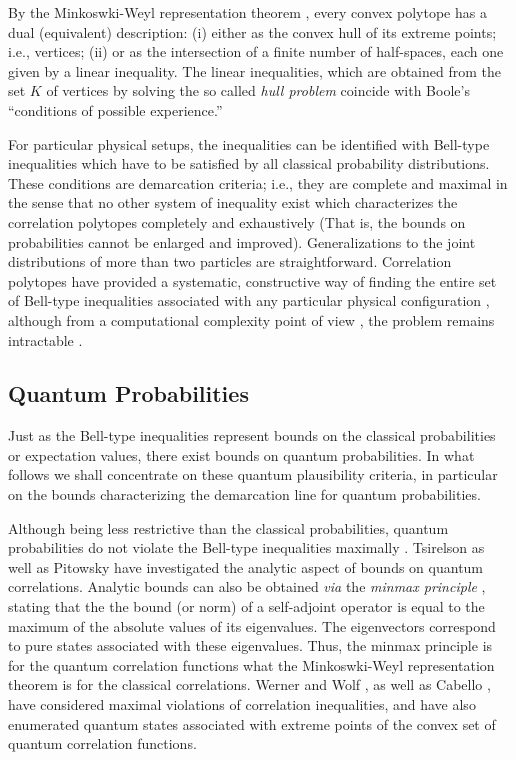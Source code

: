 \documentclass[pra,showpacs,showkeys,amsfonts]{revtex4}
\begin{document}
By the Minkoswki-Weyl representation theorem \cite[p.29]{ziegler},
every convex polytope has a dual (equivalent) description:
(i)
either as the convex hull of its extreme points; i.e., vertices;
(ii)
or as the intersection of a finite number of half-spaces,
each one given by a linear inequality.
The linear inequalities,
which are obtained
from the set $K$ of vertices
by solving the so called {\em hull problem}
coincide with Boole's ``conditions of possible experience.''

For particular physical setups,
the inequalities can be identified with Bell-type inequalities which have to be satisfied by
all classical probability distributions.
These conditions are demarcation criteria; i.e.,
they are complete and maximal in the sense that no other system of inequality exist
which characterizes the correlation polytopes completely and exhaustively
(That is, the bounds on probabilities cannot be enlarged and improved).
Generalizations to the joint distributions of more than two particles are straightforward.
Correlation polytopes have provided a systematic, constructive way of finding
the entire set of Bell-type inequalities associated with any particular physical configuration
\cite{2000-poly,2001-cddif}, although from a computational complexity point of view
\cite{garey}, the problem remains intractable \cite{Pit-91}.

\subsection{Quantum Probabilities}

Just as the Bell-type inequalities represent bounds on the
classical probabilities or expectation values,
there exist bounds on quantum probabilities.
In what follows we shall concentrate on these
quantum plausibility criteria, in particular on the bounds
characterizing the demarcation line for quantum probabilities.

Although being less restrictive than the classical probabilities,
quantum probabilities do not violate the
Bell-type inequalities maximally
\cite{pop-rohr,mermin-1995,svozil-krenn}.
Tsirelson \cite{cirelson:80,cirelson,khalfin-97}
as well as Pitowsky \cite{pit:range-2001}
have investigated the analytic aspect of bounds on quantum
correlations.
Analytic bounds can also be obtained {\it via} the
{\em minmax principle} \cite[\S 90]{halmos-vs}, stating that
the the bound (or norm) of a self-adjoint operator is equal to the maximum
of the absolute values of its eigenvalues.
The eigenvectors correspond to pure states associated with these eigenvalues.
Thus, the minmax principle is for the quantum correlation functions
what the Minkoswki-Weyl representation theorem is for the classical correlations.
Werner and Wolf \cite{werner-wolf-2001}, as well as Cabello \cite{cabello-2003a},
have considered maximal violations
of correlation inequalities, and have also enumerated quantum states
associated with extreme points of the convex set of quantum correlation functions.
\end{document}
